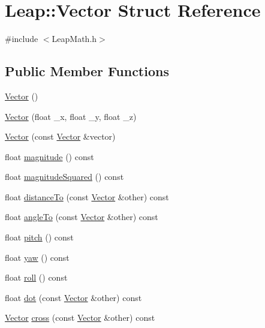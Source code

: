 \hypertarget{struct_leap_1_1_vector}{}\section{Leap\+:\+:Vector Struct Reference}
\label{struct_leap_1_1_vector}


{\ttfamily \#include $<$Leap\+Math.\+h$>$}

\subsection*{Public Member Functions}
\begin{DoxyCompactItemize}
\item 
\hyperlink{struct_leap_1_1_vector_a0d7a6417136be2cde1ddd56c39244929}{Vector} ()
\item 
\hyperlink{struct_leap_1_1_vector_a58bde18133811a15d122a785f0b36b80}{Vector} (float \+\_\+x, float \+\_\+y, float \+\_\+z)
\item 
\hyperlink{struct_leap_1_1_vector_a2b271c5d88e466f17771e62bd8faea94}{Vector} (const \hyperlink{struct_leap_1_1_vector}{Vector} \&vector)
\item 
float \hyperlink{struct_leap_1_1_vector_a81d1a5007b71022ee3443f2d61be4c3e}{magnitude} () const
\item 
float \hyperlink{struct_leap_1_1_vector_ad45ef98121a5f8d26894da7bbe68e4e1}{magnitude\+Squared} () const
\item 
float \hyperlink{struct_leap_1_1_vector_ae2334e1435f06ce1ffe4019b66bd08a8}{distance\+To} (const \hyperlink{struct_leap_1_1_vector}{Vector} \&other) const
\item 
float \hyperlink{struct_leap_1_1_vector_ae76a80d9b19e35f3748afaf8fc7c9736}{angle\+To} (const \hyperlink{struct_leap_1_1_vector}{Vector} \&other) const
\item 
float \hyperlink{struct_leap_1_1_vector_a214e71f85bcf03950df1c86922d07634}{pitch} () const
\item 
float \hyperlink{struct_leap_1_1_vector_a42ebba3b0dc3d7f3e5eacf4a0cc39a6d}{yaw} () const
\item 
float \hyperlink{struct_leap_1_1_vector_a333f0b7b114e26107ec100ea8d7c5976}{roll} () const
\item 
float \hyperlink{struct_leap_1_1_vector_a2a1f2fbbd208e3aeb9b51d0783780458}{dot} (const \hyperlink{struct_leap_1_1_vector}{Vector} \&other) const
\item 
\hyperlink{struct_leap_1_1_vector}{Vector} \hyperlink{struct_leap_1_1_vector_a2104b0be8307d670308b7807cd5d440a}{cross} (const \hyperlink{struct_leap_1_1_vector}{Vector} \&other) const

\end{DoxyCompactItemize}
